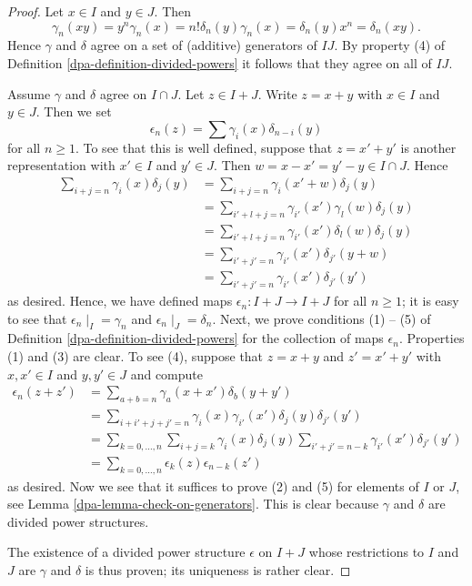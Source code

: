 \begin{proof}

Let $x \in I$ and $y \in J$. Then
$$
\gamma_n(xy) = y^n\gamma_n(x) = n! \delta_n(y) \gamma_n(x) =
\delta_n(y) x^n = \delta_n(xy).
$$
Hence $\gamma$ and $\delta$ agree on a set of (additive) generators
of $IJ$. By property (4) of Definition \ref{dpa-definition-divided-powers}
it follows that they agree on all of $IJ$.

\medskip\noindent
Assume $\gamma$ and $\delta$ agree on $I \cap J$.
Let $z \in I + J$. Write $z = x + y$ with $x \in I$ and $y \in J$.
Then we set
$$
\epsilon_n(z) = \sum \gamma_i(x)\delta_{n - i}(y)
$$
for all $n \geq 1$.
To see that this is well defined, suppose that $z = x' + y'$ is another
representation with $x' \in I$ and $y' \in J$. Then
$w = x - x' = y' - y \in I \cap J$. Hence
\begin{align*}
\sum\nolimits_{i + j = n} \gamma_i(x)\delta_j(y)
& =
\sum\nolimits_{i + j = n} \gamma_i(x' + w)\delta_j(y) \\
& =
\sum\nolimits_{i' + l + j = n} \gamma_{i'}(x')\gamma_l(w)\delta_j(y) \\
& =
\sum\nolimits_{i' + l + j = n} \gamma_{i'}(x')\delta_l(w)\delta_j(y) \\
& =
\sum\nolimits_{i' + j' = n} \gamma_{i'}(x')\delta_{j'}(y + w) \\
& =
\sum\nolimits_{i' + j' = n} \gamma_{i'}(x')\delta_{j'}(y')
\end{align*}
as desired. Hence, we have defined maps
$\epsilon_n : I + J \to I + J$ for all $n \geq 1$; it is easy
to see that $\epsilon_n \mid_{I} = \gamma_n$ and
$\epsilon_n \mid_{J} = \delta_n$.
Next, we prove conditions (1) -- (5) of
Definition \ref{dpa-definition-divided-powers} for the collection
of maps $\epsilon_n$.
Properties (1) and (3) are clear. To see (4), suppose
that $z = x + y$ and $z' = x' + y'$ with $x, x' \in I$ and $y, y' \in J$
and compute
\begin{align*}
\epsilon_n(z + z') & =
\sum\nolimits_{a + b = n} \gamma_a(x + x')\delta_b(y + y') \\
& =
\sum\nolimits_{i + i' + j + j' = n}
\gamma_i(x) \gamma_{i'}(x')\delta_j(y)\delta_{j'}(y') \\
& =
\sum\nolimits_{k = 0, \ldots, n}
\sum\nolimits_{i+j=k} \gamma_i(x)\delta_j(y)
\sum\nolimits_{i'+j'=n-k} \gamma_{i'}(x')\delta_{j'}(y') \\
& =
\sum\nolimits_{k = 0, \ldots, n}\epsilon_k(z)\epsilon_{n-k}(z')
\end{align*}
as desired. Now we see that it suffices to prove (2) and (5) for
elements of $I$ or $J$, see Lemma \ref{dpa-lemma-check-on-generators}.
This is clear because $\gamma$ and $\delta$ are divided power
structures.

\medskip\noindent
The existence of a divided power structure $\epsilon$ on $I+J$
whose restrictions to $I$ and $J$ are $\gamma$ and $\delta$ is
thus proven; its uniqueness is rather clear.
\end{proof}

